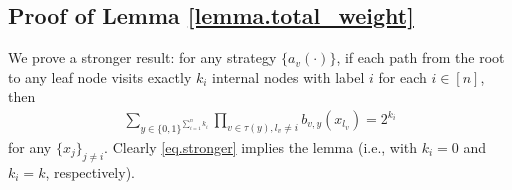 \documentclass[final,12pt]{colt2018} %
\def \bP {\mathbb{P}}
\def \bE {\mathbb{E}}
\def \spo {\mathsf{Poi}}
\begin{document}
%

\subsection{Proof of Lemma \ref{lemma.total_weight}}
We prove a stronger result: for any strategy $\{a_v(\cdot)\}$, if each path from the root to any leaf node visits exactly $k_i$ internal nodes with label $i$ for each $i\in [n]$, then
\begin{align}\label{eq.stronger}
\sum_{y\in \{0,1\}^{\sum_{i=1}^n k_i}} \prod_{v\in \tau(y), l_v\neq i} b_{v,y}(x_{l_v}) = 2^{k_i}
\end{align}
for any $\{x_j\}_{j\neq i}$. Clearly \eqref{eq.stronger} implies the lemma (i.e., with $k_i=0$ and $k_i=k$, respectively). 
\end{document}
